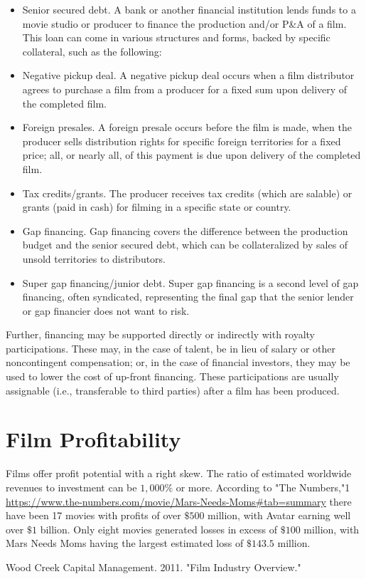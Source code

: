 \documentclass[11pt]{article}
\begin{document}
\begin{itemize}
  \item Senior secured debt. A bank or another financial institution lends funds to a movie studio or producer to finance the production and/or P\&A of a film. This loan can come in various structures and forms, backed by specific collateral, such as the following:
  \item Negative pickup deal. A negative pickup deal occurs when a film distributor agrees to purchase a film from a producer for a fixed sum upon delivery of the completed film.
  \item Foreign presales. A foreign presale occurs before the film is made, when the producer sells distribution rights for specific foreign territories for a fixed price; all, or nearly all, of this payment is due upon delivery of the completed film.
  \item Tax credits/grants. The producer receives tax credits (which are salable) or grants (paid in cash) for filming in a specific state or country.
  \item Gap financing. Gap financing covers the difference between the production budget and the senior secured debt, which can be collateralized by sales of unsold territories to distributors.
  \item Super gap financing/junior debt. Super gap financing is a second level of gap financing, often syndicated, representing the final gap that the senior lender or gap financier does not want to risk.
\end{itemize}

Further, financing may be supported directly or indirectly with royalty participations. These may, in the case of talent, be in lieu of salary or other noncontingent compensation; or, in the case of financial investors, they may be used to lower the cost of up-front financing. These participations are usually assignable (i.e., transferable to third parties) after a film has been produced.

\section*{Film Profitability}
Films offer profit potential with a right skew. The ratio of estimated worldwide revenues to investment can be $1,000 \%$ or more. According to "The Numbers,"1 \href{https://www.the-numbers.com/movie/Mars-Needs-Moms#tab=summary}{https://www.the-numbers.com/movie/Mars-Needs-Moms\#tab=summary} there have been 17 movies with profits of over $\$ 500$ million, with Avatar earning well over $\$ 1$ billion. Only eight movies generated losses in excess of $\$ 100$ million, with Mars Needs Moms having the largest estimated loss of $\$ 143.5$ million.

Wood Creek Capital Management. 2011. "Film Industry Overview."
\end{document}
